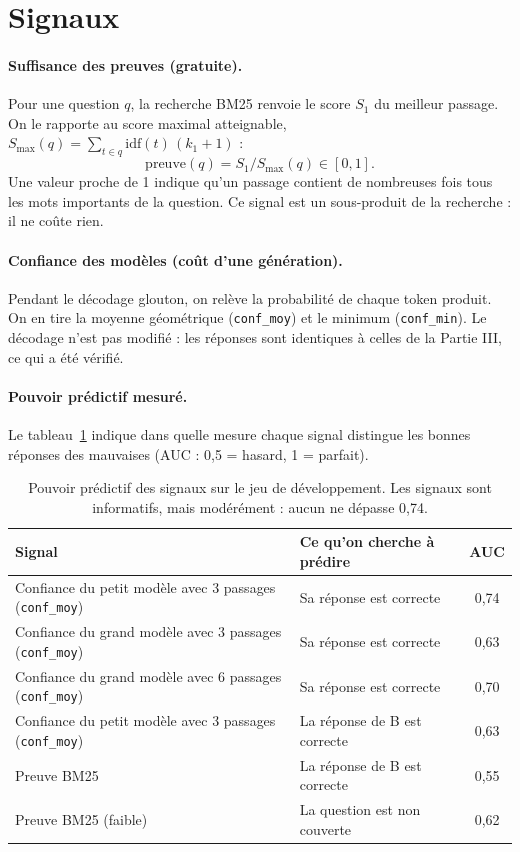\documentclass[11pt,a4paper]{article}
\begin{document}
\section{Signaux}\label{sec:signaux}

\paragraph{Suffisance des preuves (gratuite).} Pour une question $q$, la recherche BM25 renvoie le score
$S_1$ du meilleur passage. On le rapporte au score maximal atteignable,
$S_{\max}(q) = \sum_{t \in q} \mathrm{idf}(t)\,(k_1+1)$ :
\[
\text{preuve}(q) = S_1 / S_{\max}(q) \in [0, 1].
\]
Une valeur proche de 1 indique qu'un passage contient de nombreuses fois tous les mots importants de la
question. Ce signal est un sous-produit de la recherche : il ne coûte rien.

\paragraph{Confiance des modèles (coût d'une génération).} Pendant le décodage glouton, on relève la
probabilité de chaque token produit. On en tire la moyenne géométrique (\texttt{conf\_moy}) et le minimum
(\texttt{conf\_min}). Le décodage n'est pas modifié : les réponses sont identiques à celles de la
Partie III, ce qui a été vérifié.

\paragraph{Pouvoir prédictif mesuré.} Le tableau~\ref{tab:auc} indique dans quelle mesure chaque signal
distingue les bonnes réponses des mauvaises (AUC : 0,5 = hasard, 1 = parfait).

\begin{table}[H]
\centering\small
\begin{tabular}{l l c}
\toprule
\textbf{Signal} & \textbf{Ce qu'on cherche à prédire} & \textbf{AUC} \\
\midrule
Confiance du petit modèle avec 3 passages (\texttt{conf\_moy}) & Sa réponse est correcte & 0,74 \\
Confiance du grand modèle avec 3 passages (\texttt{conf\_moy}) & Sa réponse est correcte & 0,63 \\
Confiance du grand modèle avec 6 passages (\texttt{conf\_moy}) & Sa réponse est correcte & 0,70 \\
Confiance du petit modèle avec 3 passages (\texttt{conf\_moy}) & La réponse de B est correcte & 0,63 \\
Preuve BM25 & La réponse de B est correcte & 0,55 \\
Preuve BM25 (faible) & La question est non couverte & 0,62 \\
\bottomrule
\end{tabular}
\caption{Pouvoir prédictif des signaux sur le jeu de développement. Les signaux sont informatifs, mais
modérément : aucun ne dépasse 0,74.}
\label{tab:auc}
\end{table}
\end{document}
